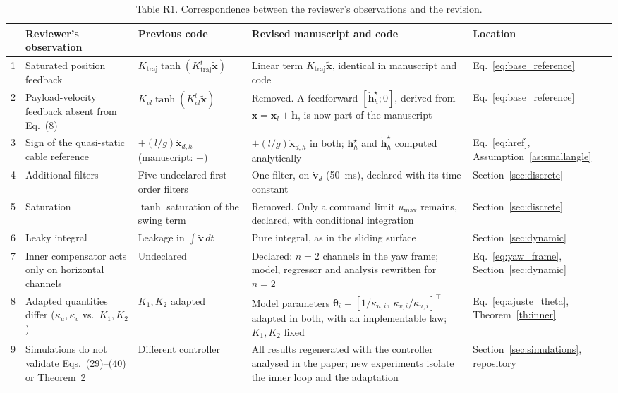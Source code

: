 \begin{reply}
\begin{table}[h]
\centering
\small
\renewcommand{\arraystretch}{1.2}
\begin{tabular}{p{0.3cm} p{3.4cm} p{3.6cm} p{5.4cm} p{2.4cm}}
\toprule
 & \textbf{Reviewer's observation} & \textbf{Previous code} & \textbf{Revised manuscript and code} & \textbf{Location} \\
\midrule
1 & Saturated position feedback & $K_{\mathrm{traj}}\tanh(K^t_{\mathrm{traj}}\tilde{\mathbf{x}})$ & Linear term $K_{\mathrm{traj}}\tilde{\mathbf{x}}$, identical in manuscript and code & Eq.~\eqref{eq:base_reference} \\
2 & Payload-velocity feedback absent from Eq.~(8) & $K_{vl}\tanh(K^t_{vl}\dot{\tilde{\mathbf{x}}})$ & Removed. A feedforward $[\dot{\mathbf{h}}^\star_h;0]$, derived from $\mathbf{x}=\mathbf{x}_l+\mathbf{h}$, is now part of the manuscript & Eq.~\eqref{eq:base_reference} \\
3 & Sign of the quasi-static cable reference & $+(l/g)\ddot{\mathbf{x}}_{d,h}$ (manuscript: $-$) & $+(l/g)\ddot{\mathbf{x}}_{d,h}$ in both; $\mathbf{h}^\star_h$ and $\dot{\mathbf{h}}^\star_h$ computed analytically & Eq.~\eqref{eq:href}, Assumption~\ref{as:smallangle} \\
4 & Additional filters & Five undeclared first-order filters & One filter, on $\dot{\mathbf{v}}_d$ (50~ms), declared with its time constant & Section~\ref{sec:discrete} \\
5 & Saturation & $\tanh$ saturation of the swing term & Removed. Only a command limit $u_{\max}$ remains, declared, with conditional integration & Section~\ref{sec:discrete} \\
6 & Leaky integral & Leakage in $\int\tilde{\mathbf{v}}\,dt$ & Pure integral, as in the sliding surface & Section~\ref{sec:dynamic} \\
7 & Inner compensator acts only on horizontal channels & Undeclared & Declared: $n=2$ channels in the yaw frame; model, regressor and analysis rewritten for $n=2$ & Eq.~\eqref{eq:yaw_frame}, Section~\ref{sec:dynamic} \\
8 & Adapted quantities differ ($\kappa_u,\kappa_v$ vs.\ $K_1,K_2$) & $K_1,K_2$ adapted & Model parameters $\boldsymbol{\theta}_i=[1/\kappa_{u,i},\ \kappa_{v,i}/\kappa_{u,i}]^\top$ adapted in both, with an implementable law; $K_1,K_2$ fixed & Eq.~\eqref{eq:ajuste_theta}, Theorem~\ref{th:inner} \\
9 & Simulations do not validate Eqs.~(29)--(40) or Theorem~2 & Different controller & All results regenerated with the controller analysed in the paper; new experiments isolate the inner loop and the adaptation & Section~\ref{sec:simulations}, repository \\
\bottomrule
\end{tabular}
\caption*{Table R1. Correspondence between the reviewer's observations and the revision.}
\end{table}


\end{reply}
